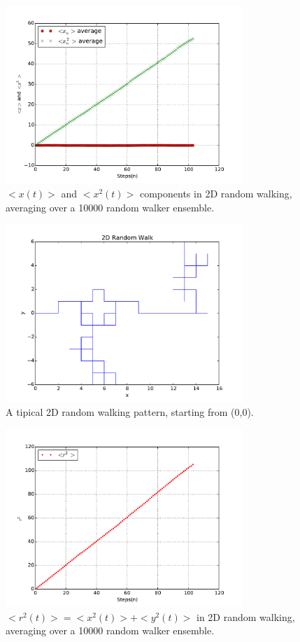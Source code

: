 \documentclass[aps,prl,preprint,superscriptaddress]{revtex4}
\begin{document}
		\begin{figure}[H]
			\centering
			\includegraphics[width=0.8\textwidth]{rwxn.pdf}
			\caption{$ <x(t)> $ and  $ <x^2(t)> $ components in 2D random walking, averaging over a 10000 random walker ensemble.}
		\end{figure}
			\begin{figure}[H]
				\centering
				\includegraphics[width=0.8\textwidth]{rwxn3.pdf}
				\caption{A tipical 2D random walking pattern, starting from (0,0).}
			\end{figure}
		\begin{figure}[H]
			\centering
			\includegraphics[width=0.8\textwidth]{rwxn2.pdf}
			\caption{$<r^2(t)> = <x^2(t)> + <y^2(t)>$ in 2D random walking, averaging over a 10000 random walker ensemble.}
		\end{figure}
\end{document}
